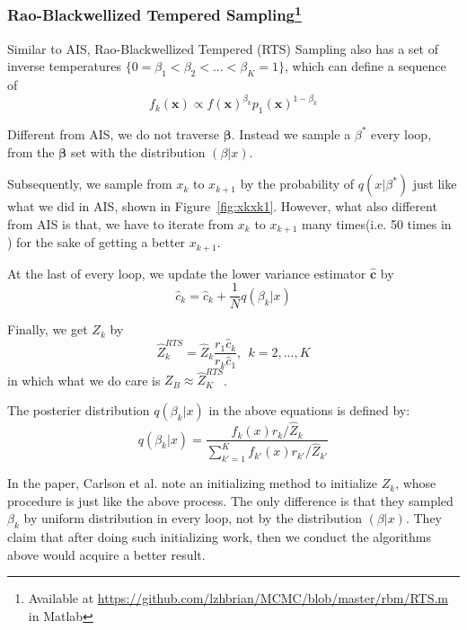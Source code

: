 
\subsubsection{Rao-Blackwellized Tempered Sampling\protect\footnote{Available at \protect\url{https://github.com/lzhbrian/MCMC/blob/master/rbm/RTS.m} in Matlab}}

Similar to AIS, Rao-Blackwellized Tempered (RTS)\cite{carlson2016partition} Sampling also has a set of inverse temperatures $\{0= \beta_{1} < \beta_{2} < ... < \beta_{K} =1\}$, which can define a sequence of
\begin{equation}
f_{k}(\mathbf x) \propto f(\mathbf x)^{\beta_{k}} p_{1}(\mathbf x)^{1-\beta_{k}}
\end{equation}

Different from AIS, we do not traverse $\mathbf \beta$. Instead we sample a $\beta^{*}$ every loop, from the $\mathbf \beta$ set with the distribution $(\beta|x)$.

Subsequently, we sample from $x_{k}$ to $x_{k+1}$ by the probability of $q(x|\beta^{*})$ just like what we did in AIS, shown in Figure~\ref{fig:xkxk1}. However, what also different from AIS is that, we have to iterate from $x_{k}$ to $x_{k+1}$ many times(i.e. 50 times in\cite{carlson2016partition} ) for the sake of getting a better $x_{k+1}$.

At the last of every loop, we update the lower variance estimator $\hat{\mathbf c}$ by
\begin{equation}
\hat{c}_{k} = \hat{c}_{k} + \frac{1}{N}q(\beta_{k}|x)
\end{equation}

Finally, we get $Z_{k}$ by
\begin{equation}
\hat{Z}_{k}^{RTS} = \hat{Z}_{k}\frac{r_{1}\hat{c}_{k}}{r_{k}\hat{c}_{1}},~~k=2,...,K
\end{equation}
in which what we do care is $Z_{B} \approx \hat{Z}_{K}^{RTS}$.

The posterier distribution $q(\beta_{k}|x)$ in the above equations is defined by:
\begin{equation}
q(\beta_{k}|x) = \frac{f_{k}(x)r_{k}/\hat{Z}_{k}}{\sum_{k'=1}^{K} f_{k'}(x)r_{k'}/\hat{Z}_{k'}}
\end{equation}

In the paper\cite{carlson2016partition}, Carlson et al. note an initializing method to initialize $Z_{k}$, whose procedure is just like the above process. The only difference is that they sampled $\beta_{k}$ by uniform distribution in every loop, not by the distribution $(\beta|x)$. They claim that after doing such initializing work, then we conduct the algorithms above would acquire a better result.

